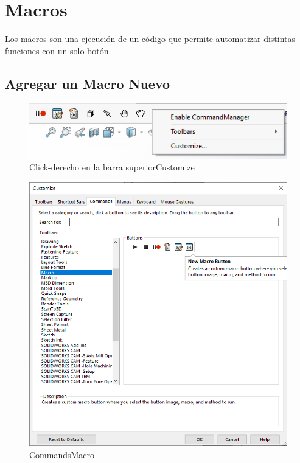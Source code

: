 \documentclass[12pt,letterpaper,final]{report}
\begin{document}
\chapter{Macros}

Los macros son una ejecución de un código que permite automatizar distintas funciones con un solo botón.

\section{Agregar un Macro Nuevo}

	\begin{figure}[H]
	\centering
	\includegraphics[width=0.85\linewidth, height=0.5\textheight,keepaspectratio]{Imagenes/solidworks_macro_01}
	\caption{Click-derecho en la barra superior\textrightarrow Customize}
	\label{fig:solidworksmacro01}
\end{figure}

\begin{figure}[H]
	\centering
	\includegraphics[width=0.85\linewidth, height=0.5\textheight,keepaspectratio]{Imagenes/solidworks_macro_02}
	\caption{Commands\textrightarrow Macro}
	\label{fig:solidworksmacro02}
\end{figure}
\end{document}

